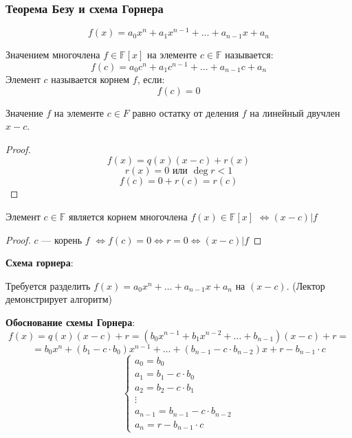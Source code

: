 \subsubsection{Теорема Безу и схема Горнера}
\[
f(x) = a_0 x^{n} + a_1 x^{n - 1} + \ldots + a_{n - 1} x + a_n
\]
\begin{definition}
Значением многочлена $f \in \mathbb{F}[x]$ на элементе $c \in \mathbb{F}$ называется:
\[
f(c) = a_0c^{n} + a_1 c^{n - 1} + \ldots + a_{n - 1}c + a_n
\]
Элемент $c$ называется корнем $f$, если:
\[
f(c) = 0
\]
\end{definition}
\begin{statement}
\label{statement:01_4}
Значение $f$ на элементе $c \in F$ равно остатку от деления $f$ на линейный двучлен $x - c$.
\end{statement}
\begin{proof}
  \[
  f(x) = q(x)(x - c) + r(x)
  \]
  \[
  r(x) = 0 \text{ или } \deg r < 1
  \]
  \[
  f(c) = 0 + r(c) = r(c)
  \]
\end{proof}
\begin{theorem}[Безу]
\label{theorem:01_2}
Элемент $c \in \mathbb{F}$ является корнем многочлена $f(x) \in \mathbb{F}[x]$ $\iff (x - c) |  f$
\end{theorem}
\begin{proof}
$c$ --- корень $f$ $\iff f(c) = 0 \iff r = 0 \iff (x - c) | f$
\end{proof}

\textbf{Схема горнера}:

Требуется разделить $f(x) = a_0 x^{n} + \ldots + a_{n - 1} x + a_n$ на $(x - c)$. (Лектор демонстрирует алгоритм)

\textbf{Обоснование схемы Горнера}:
\[
f(x) = q(x) (x - c) + r = (b_0 x^{n - 1} + b_1 x^{n - 2} + \ldots + b_{n - 1})(x - c) + r = 
\]
\[
 = b_0 x^{n} + (b_1 - c \cdot b_0) x^{n - 1} + \ldots + (b_{n - 1} - c \cdot b_{n - 2})x + r - b_{n - 1} \cdot c
\]
\[
\begin{cases}
a_0 = b_0 \\
a_1 = b_1 - c \cdot b_0 \\
a_2 = b_2 - c \cdot b_1 \\
\vdots \\
a_{n - 1} = b_{n - 1} - c \cdot b_{n - 2} \\
a_{n} = r - b_{n - 1} \cdot c
\end{cases}
\]
